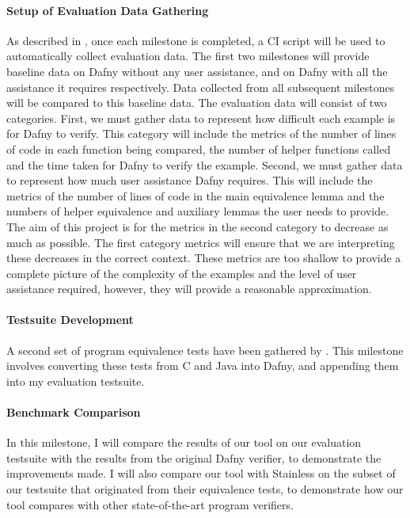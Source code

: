 \paragraph{Setup of Evaluation Data Gathering}\label{para:evaluation-data-gathering} As described in , once each milestone is completed, a CI script will be used to automatically collect evaluation data. The first two milestones will provide baseline data on Dafny without any user assistance, and on Dafny with all the assistance it requires respectively. Data collected from all subsequent milestones will be compared to this baseline data. The evaluation data will consist of two categories. First, we must gather data to represent how difficult each example is for Dafny to verify. This category will include the metrics of the number of lines of code in each function being compared, the number of helper functions called and the time taken for Dafny to verify the example. Second, we must gather data to represent how much user assistance Dafny requires. This will include the metrics of the number of lines of code in the main equivalence lemma and the numbers of helper equivalence and auxiliary lemmas the user needs to provide. The aim of this project is for the metrics in the second category to decrease as much as possible. The first category metrics will ensure that we are interpreting these decreases in the correct context. These metrics are too shallow to provide a complete picture of the complexity of the examples and the level of user assistance required, however, they will provide a reasonable approximation. 

\paragraph{Testsuite Development}\label{para:testsuite-development} A second set of program equivalence tests have been gathered by \textcite{badihiEqBenchDatasetEquivalent2021}. This milestone involves converting these tests from C and Java into Dafny, and appending them into my evaluation testsuite.

\paragraph{Benchmark Comparison}\label{para:benchmark-comparison} In this milestone, I will compare the results of our tool on our evaluation testsuite with the results from the original Dafny verifier, to demonstrate the improvements made. I will also compare our tool with Stainless on the subset of our testsuite that originated from their equivalence tests, to demonstrate how our tool compares with other state-of-the-art program verifiers. 